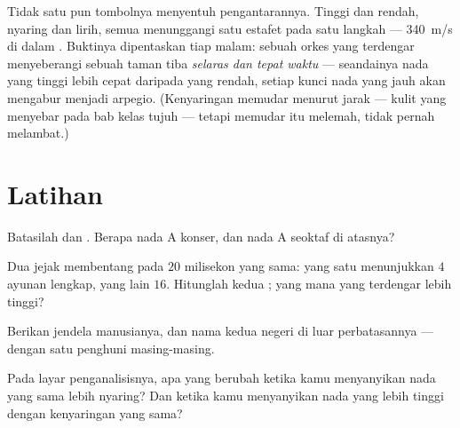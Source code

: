 \begin{example}\label{ex:g8:sound-pitch-loudness:speed}
Tidak satu pun tombolnya menyentuh pengantarannya. Tinggi dan rendah,
nyaring dan lirih, semua  menunggangi satu estafet  pada
satu langkah  --- \qty{340}{m/s} di dalam . Buktinya
dipentaskan tiap malam: sebuah orkes yang terdengar menyeberangi
sebuah taman tiba \emph{selaras dan tepat waktu} --- seandainya nada
yang tinggi lebih cepat daripada yang rendah, setiap kunci nada yang
jauh akan mengabur menjadi arpegio. (Kenyaringan memudar menurut jarak
--- kulit yang menyebar pada bab kelas tujuh --- tetapi memudar itu
melemah, tidak pernah melambat.)
\end{example}

\section{Latihan}

\begin{exercise}[$\star$]\label{exo:g8:sound-pitch-loudness:1}
Batasilah  dan . Berapa nada A konser, dan nada A
seoktaf di atasnya?
\end{exercise}

\begin{exercise}[$\star$]\label{exo:g8:sound-pitch-loudness:2}
Dua jejak membentang pada $20$ milisekon yang sama: yang satu
menunjukkan $4$ ayunan lengkap, yang lain $16$. Hitunglah kedua
; yang mana yang terdengar lebih tinggi?
\end{exercise}

\begin{exercise}[$\star$]\label{exo:g8:sound-pitch-loudness:3}
Berikan jendela  manusianya, dan nama kedua negeri di luar
perbatasannya --- dengan satu penghuni masing-masing.
\end{exercise}

\begin{exercise}[$\star$]\label{exo:g8:sound-pitch-loudness:4}
Pada layar penganalisisnya, apa yang berubah ketika kamu menyanyikan
nada yang sama lebih nyaring? Dan ketika kamu menyanyikan nada yang
lebih tinggi dengan kenyaringan yang sama?
\end{exercise}


